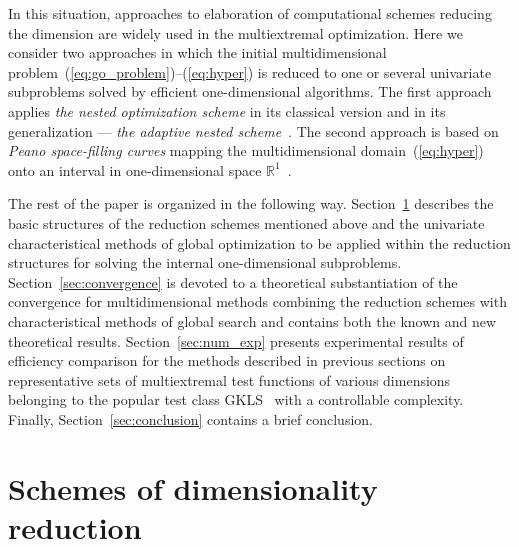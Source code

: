 \documentclass[preprint]{elsarticle}
\begin{document}
In this situation, approaches to elaboration of computational schemes reducing the dimension are widely used in the multiextremal optimization. Here we consider two approaches in which the initial multidimensional problem~(\ref{eq:go_problem})--(\ref{eq:hyper}) is reduced to one or several univariate subproblems solved by efficient one-dimensional algorithms. The first approach applies \emph{the nested optimization scheme} in its classical version \cite{bib31,bib32,bib33,bib34,bib35,bib36,bib37} and in its generalization --- \emph{the adaptive nested scheme}~\cite{bib38,bib39}. The second approach is based on \emph{Peano space-filling curves} mapping the multidimensional domain~(\ref{eq:hyper}) onto an interval in one-dimensional space $\mathbb{R}^1$~\cite{bib5,bib40,bib41,bib42,bib43,bib44,bib45,bib47}.

The rest of the paper is organized in the following way. Section~\ref{sec:dim_reduction} describes the basic structures of the reduction schemes mentioned above and the univariate characteristical methods of global optimization to be applied within the reduction structures for solving the internal one-dimensional subproblems. Section~\ref{sec:convergence} is devoted to a theoretical substantiation of the convergence for multidimensional methods combining the reduction schemes with characteristical methods of global search and contains both the known and new theoretical results. Section~\ref{sec:num_exp} presents experimental results of efficiency comparison for the methods described in previous sections on representative sets of multiextremal test functions of various dimensions belonging to the popular test class GKLS~\cite{bib48} with a controllable complexity. Finally, Section~\ref{sec:conclusion} contains a brief conclusion.

\section{Schemes of dimensionality reduction}
\label{sec:dim_reduction}
\end{document}
